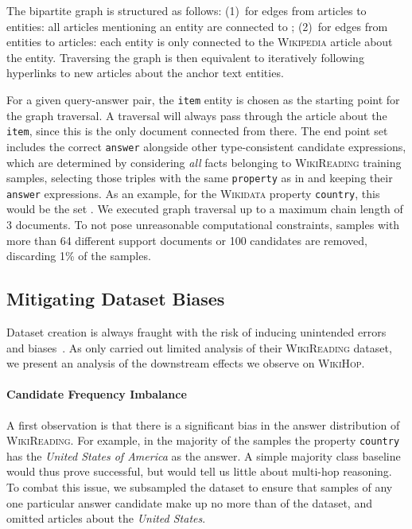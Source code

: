 \documentclass[11pt,letterpaper]{article}
\newcommand{\WikiHop}{\textsc{WikiHop}\xspace}
\newcommand{\WikiReading}{\textsc{WikiReading}\xspace}
\newcommand{\Wikidata}{\textsc{Wikidata}\xspace}
\newcommand{\Wikipedia}{\textsc{Wikipedia}\xspace}
\begin{document}
The bipartite graph is structured as follows: (1)~for edges from articles to entities: all articles mentioning an entity  are connected to ; (2)~for edges from entities to articles: each entity  is only connected to the \Wikipedia article about the entity.
Traversing the graph is then equivalent to iteratively following hyperlinks to new articles about the anchor text entities.


For a given query-answer pair, the {\smaller \texttt{item}} entity is chosen as the starting point for the graph traversal.
A traversal will always pass through the article about the {\small \texttt{item}}, since this is the only document connected from there. 
The end point set includes the correct {\texttt{\smaller answer}} alongside other type-consistent candidate expressions, which are determined by considering \emph{all} facts belonging to \WikiReading training samples, selecting those triples with the same {\smaller \texttt{property}} as in  and keeping their {\smaller \texttt{answer}} expressions.
As an example, for the \Wikidata property {\smaller \texttt{country}}, this would be the set .
We executed graph traversal up to a maximum chain length of 3 documents.
To not pose unreasonable computational constraints, samples with more than 64 different support documents or 100 candidates are removed, discarding 1\% of the samples.



\subsection{Mitigating Dataset Biases}
\label{sec:mitigating}
Dataset creation is always fraught with the risk of inducing unintended errors and biases~\cite{chen_2016_thorough,schwartz2017effect}.
As  only carried out limited analysis of their \WikiReading dataset, we present an analysis of the downstream effects we observe on \WikiHop.


\paragraph{Candidate Frequency Imbalance}
A first observation is that there is a significant bias in the answer distribution of \WikiReading.
For example, in the majority of the samples the property {\small \texttt{country}} has the \emph{United States of America} as the answer.
A simple majority class baseline would thus prove successful, but would tell us little about multi-hop reasoning.
To combat this issue, we subsampled the dataset to ensure that samples of any one particular answer candidate make up no more than  of the dataset, and omitted articles about the \emph{United States}.
\end{document}
